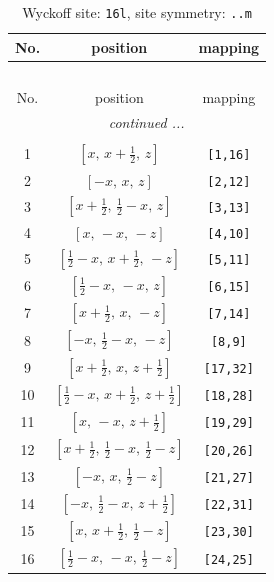 \documentclass[fleqn,8pt]{jsarticle}
\begin{document}
\renewcommand{\arraystretch}{1.2}
\begin{longtable}{ccc}
\caption{Wyckoff site: {\tt 16l}, site symmetry: {\tt ..m}}
 \\
 \hline \hline
No. & position & mapping \\ \hline \endfirsthead

\multicolumn{2}{l}{\tablename\ \thetable{}} \\
 \hline \hline
No. & position & mapping \\ \hline \endhead

 \hline \hline
\multicolumn{2}{r}{\footnotesize\it continued ...} \\ \endfoot

 \hline \hline
\multicolumn{2}{r}{} \\ \endlastfoot

1 & $\left[ x,\, x + \frac{1}{2},\, z \right]$ & {\tt [1,16]} \\ \hline
2 & $\left[ - x,\, x,\, z \right]$ & {\tt [2,12]} \\ \hline
3 & $\left[ x + \frac{1}{2},\, \frac{1}{2} - x,\, z \right]$ & {\tt [3,13]} \\ \hline
4 & $\left[ x,\, - x,\, - z \right]$ & {\tt [4,10]} \\ \hline
5 & $\left[ \frac{1}{2} - x,\, x + \frac{1}{2},\, - z \right]$ & {\tt [5,11]} \\ \hline
6 & $\left[ \frac{1}{2} - x,\, - x,\, z \right]$ & {\tt [6,15]} \\ \hline
7 & $\left[ x + \frac{1}{2},\, x,\, - z \right]$ & {\tt [7,14]} \\ \hline
8 & $\left[ - x,\, \frac{1}{2} - x,\, - z \right]$ & {\tt [8,9]} \\ \hline
9 & $\left[ x + \frac{1}{2},\, x,\, z + \frac{1}{2} \right]$ & {\tt [17,32]} \\ \hline
10 & $\left[ \frac{1}{2} - x,\, x + \frac{1}{2},\, z + \frac{1}{2} \right]$ & {\tt [18,28]} \\ \hline
11 & $\left[ x,\, - x,\, z + \frac{1}{2} \right]$ & {\tt [19,29]} \\ \hline
12 & $\left[ x + \frac{1}{2},\, \frac{1}{2} - x,\, \frac{1}{2} - z \right]$ & {\tt [20,26]} \\ \hline
13 & $\left[ - x,\, x,\, \frac{1}{2} - z \right]$ & {\tt [21,27]} \\ \hline
14 & $\left[ - x,\, \frac{1}{2} - x,\, z + \frac{1}{2} \right]$ & {\tt [22,31]} \\ \hline
15 & $\left[ x,\, x + \frac{1}{2},\, \frac{1}{2} - z \right]$ & {\tt [23,30]} \\ \hline
16 & $\left[ \frac{1}{2} - x,\, - x,\, \frac{1}{2} - z \right]$ & {\tt [24,25]} \\
\end{longtable}
\end{document}
